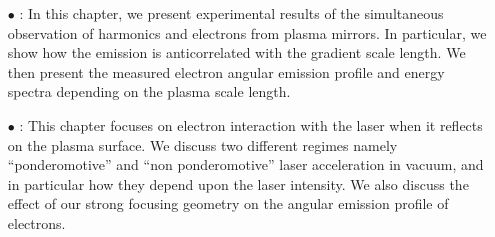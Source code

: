 \begin{itemize}
\item[$\bullet$]  : In this chapter, we present experimental results of the simultaneous observation of harmonics and electrons from plasma mirrors. In particular, we show how the emission is anticorrelated with the gradient scale length. We then present the measured electron angular emission profile and energy spectra depending on the plasma scale length.




\item[$\bullet$]  : This chapter focuses on electron interaction with the laser when it reflects on the plasma surface. We discuss two different regimes namely ``ponderomotive'' and ``non ponderomotive'' laser acceleration in vacuum, and in particular how they depend upon the laser intensity. We also discuss the effect of our strong focusing geometry  on the angular emission profile of electrons.

\end{itemize}



































